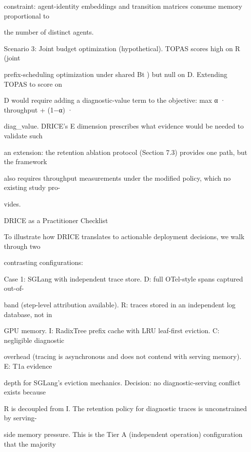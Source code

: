 \begin{flushleft}
\noindent constraint: agent-identity embeddings and transition matrices consume memory proportional to\par
\noindent the number of distinct agents.\par
\par\smallskip
\noindent Scenario 3: Joint budget optimization (hypothetical). TOPAS scores high on R (joint\par
\noindent prefix-scheduling optimization under shared Bt ) but null on D. Extending TOPAS to score on\par
\noindent D would require adding a diagnostic-value term to the objective: max α · throughput + (1−α) ·\par
\noindent diag\_value. DRICE’s E dimension prescribes what evidence would be needed to validate such\par
\noindent an extension: the retention ablation protocol (Section 7.3) provides one path, but the framework\par
\noindent also requires throughput measurements under the modified policy, which no existing study pro-\par
\noindent vides.\par
\par\smallskip
{} DRICE as a Practitioner Checklist\par
\noindent To illustrate how DRICE translates to actionable deployment decisions, we walk through two\par
\noindent contrasting configurations:\par
\par\smallskip
\noindent Case 1: SGLang with independent trace store. D: full OTel-style spans captured out-of-\par
\noindent band (step-level attribution available). R: traces stored in an independent log database, not in\par
\noindent GPU memory. I: RadixTree prefix cache with LRU leaf-first eviction. C: negligible diagnostic\par
\noindent overhead (tracing is asynchronous and does not contend with serving memory). E: T1a evidence\par
\noindent depth for SGLang’s eviction mechanics. Decision: no diagnostic-serving conflict exists because\par
\noindent R is decoupled from I. The retention policy for diagnostic traces is unconstrained by serving-\par
\noindent side memory pressure. This is the Tier A (independent operation) configuration that the majority\par

\end{flushleft}
